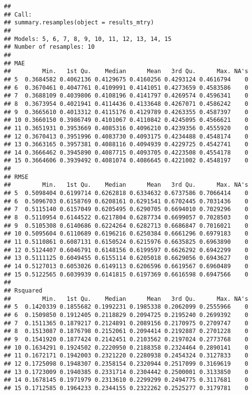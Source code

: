\documentclass[
]{article}
\begin{document}
\begin{verbatim}
## 
## Call:
## summary.resamples(object = results_mtry)
## 
## Models: 5, 6, 7, 8, 9, 10, 11, 12, 13, 14, 15 
## Number of resamples: 10 
## 
## MAE 
##         Min.   1st Qu.    Median      Mean   3rd Qu.      Max. NA's
## 5  0.3684582 0.4062136 0.4129675 0.4160256 0.4293124 0.4616794    0
## 6  0.3670461 0.4047761 0.4109991 0.4141051 0.4273659 0.4583586    0
## 7  0.3688109 0.4039806 0.4108196 0.4141797 0.4269574 0.4596341    0
## 8  0.3673954 0.4021941 0.4114436 0.4133648 0.4267071 0.4586242    0
## 9  0.3665610 0.4013312 0.4115176 0.4129789 0.4263355 0.4587397    0
## 10 0.3660150 0.3986749 0.4101067 0.4110842 0.4245095 0.4566621    0
## 11 0.3651931 0.3953669 0.4085316 0.4096210 0.4239356 0.4555920    0
## 12 0.3670413 0.3951996 0.4083730 0.4093175 0.4234488 0.4548174    0
## 13 0.3663165 0.3957381 0.4088116 0.4094939 0.4229725 0.4542741    0
## 14 0.3666462 0.3945890 0.4087715 0.4093705 0.4223508 0.4554178    0
## 15 0.3664606 0.3939492 0.4081074 0.4086645 0.4221002 0.4548197    0
## 
## RMSE 
##         Min.   1st Qu.    Median      Mean   3rd Qu.      Max. NA's
## 5  0.5098404 0.6199714 0.6262818 0.6334632 0.6737586 0.7066414    0
## 6  0.5096703 0.6158769 0.6208161 0.6291541 0.6702445 0.7031436    0
## 7  0.5115140 0.6157049 0.6205495 0.6290705 0.6694010 0.7029296    0
## 8  0.5110954 0.6144522 0.6217804 0.6287734 0.6699057 0.7028503    0
## 9  0.5105308 0.6140686 0.6224264 0.6282713 0.6686847 0.7016021    0
## 10 0.5095604 0.6110689 0.6196216 0.6250384 0.6661296 0.6979183    0
## 11 0.5110861 0.6087131 0.6150524 0.6215976 0.6635825 0.6963890    0
## 12 0.5124407 0.6046791 0.6148156 0.6199597 0.6626292 0.6942299    0
## 13 0.5111125 0.6049455 0.6155114 0.6205018 0.6629056 0.6943627    0
## 14 0.5127013 0.6053026 0.6149113 0.6206596 0.6619567 0.6960489    0
## 15 0.5122565 0.6039939 0.6141815 0.6197369 0.6616598 0.6947566    0
## 
## Rsquared 
##         Min.   1st Qu.    Median      Mean   3rd Qu.      Max. NA's
## 5  0.1420339 0.1855682 0.1992231 0.1985338 0.2062099 0.2555966    0
## 6  0.1509850 0.1912405 0.2118829 0.2094725 0.2195240 0.2699392    0
## 7  0.1511365 0.1879217 0.2124891 0.2089156 0.2170975 0.2709747    0
## 8  0.1513087 0.1876798 0.2152061 0.2094414 0.2192887 0.2701228    0
## 9  0.1541920 0.1877424 0.2142451 0.2103562 0.2197024 0.2773768    0
## 10 0.1634291 0.1924502 0.2220950 0.2188358 0.2324464 0.2890141    0
## 11 0.1672171 0.1942003 0.2321220 0.2280938 0.2454324 0.3127833    0
## 12 0.1725098 0.1948307 0.2358154 0.2320944 0.2517099 0.3169619    0
## 13 0.1723009 0.1940385 0.2331714 0.2304442 0.2500001 0.3133850    0
## 14 0.1678145 0.1971979 0.2313610 0.2299299 0.2494775 0.3117681    0
## 15 0.1712585 0.1964233 0.2344155 0.2322262 0.2525277 0.3179781    0
\end{verbatim}
\end{document}
